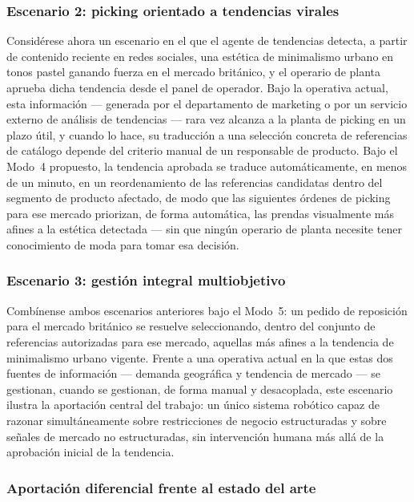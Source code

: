 \documentclass[conference]{IEEEtran}
\begin{document}
\subsubsection{Escenario 2: picking orientado a tendencias virales}

Considérese ahora un escenario en el que el agente de tendencias detecta,
a partir de contenido reciente en redes sociales, una estética de
minimalismo urbano en tonos pastel ganando fuerza en el mercado británico, y
el operario de planta aprueba dicha tendencia desde el panel de operador.
Bajo la operativa actual, esta información --- generada por el departamento
de marketing o por un servicio externo de análisis de tendencias --- rara
vez alcanza a la planta de picking en un plazo útil, y cuando lo hace, su
traducción a una selección concreta de referencias de catálogo depende del
criterio manual de un responsable de producto. Bajo el Modo~4 propuesto, la
tendencia aprobada se traduce automáticamente, en menos de un minuto, en un
reordenamiento de las referencias candidatas dentro del segmento de producto
afectado, de modo que las siguientes órdenes de picking para ese mercado
priorizan, de forma automática, las prendas visualmente más afines a la
estética detectada --- sin que ningún operario de planta necesite tener
conocimiento de moda para tomar esa decisión.

\subsubsection{Escenario 3: gestión integral multiobjetivo}

Combínense ambos escenarios anteriores bajo el Modo~5: un pedido de
reposición para el mercado británico se resuelve seleccionando, dentro del
conjunto de referencias autorizadas para ese mercado, aquellas más afines a
la tendencia de minimalismo urbano vigente. Frente a una operativa actual en
la que estas dos fuentes de información --- demanda geográfica y tendencia
de mercado --- se gestionan, cuando se gestionan, de forma manual y
desacoplada, este escenario ilustra la aportación central del trabajo: un
único sistema robótico capaz de razonar simultáneamente sobre restricciones
de negocio estructuradas y sobre señales de mercado no estructuradas, sin
intervención humana más allá de la aprobación inicial de la tendencia.

\subsubsection{Aportación diferencial frente al estado del arte}
\end{document}
